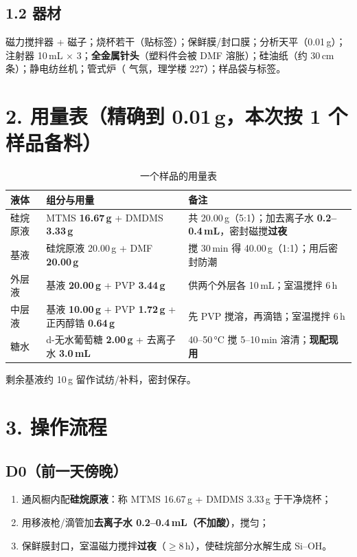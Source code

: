 \documentclass[a4paper, 11pt]{ctexart}
\begin{document}
\subsection*{1.2 器材}
磁力搅拌器 + 磁子；烧杯若干（贴标签）；保鲜膜/封口膜；分析天平（0.01\,g）；注射器 10\,mL $\times$ 3；\textbf{全金属针头}（塑料件会被 DMF 溶胀）；硅油纸（约 30\,cm 条）；静电纺丝机；管式炉（ 气氛，理学楼 227）；样品袋与标签。

\section*{2. 用量表（精确到 0.01\,g，本次按 1 个样品备料）}
\begin{table}[htbp]
\centering
\caption{一个样品的用量表}
\begin{tabularx}{\textwidth}{l l X}
\toprule
液体 & 组分与用量 & 备注 \\
\midrule
硅烷原液 & MTMS \textbf{16.67\,g} + DMDMS \textbf{3.33\,g} & 共 20.00\,g（5:1）；加去离子水 \textbf{0.2--0.4\,mL}，密封磁搅\textbf{过夜} \\
基液 & 硅烷原液 20.00\,g + DMF \textbf{20.00\,g} & 搅 30\,min 得 40.00\,g（1:1）；用后密封防潮 \\
外层液 & 基液 \textbf{20.00\,g} + PVP \textbf{3.44\,g} & 供两个外层各 10\,mL；室温搅拌 6\,h \\
中层液 & 基液 \textbf{10.00\,g} + PVP \textbf{1.72\,g} + 正丙醇锆 \textbf{0.64\,g} & 先 PVP 搅溶，再滴锆；室温搅拌 6\,h \\
糖水 & d-无水葡萄糖 \textbf{2.00\,g} + 去离子水 \textbf{3.0\,mL} & 40--50\,°C 搅 5--10\,min 溶清；\textbf{现配现用} \\
\bottomrule
\end{tabularx}
\end{table}

\noindent 剩余基液约 10\,g 留作试纺/补料，密封保存。

\section*{3. 操作流程}
\subsection*{D0（前一天傍晚）}
\begin{enumerate}
  \item 通风橱内配\textbf{硅烷原液}：称 MTMS 16.67\,g + DMDMS 3.33\,g 于干净烧杯；
  \item 用移液枪/滴管加\textbf{去离子水 0.2--0.4\,mL（不加酸）}，搅匀；
  \item 保鲜膜封口，室温磁力搅拌\textbf{过夜}（$\geq$8\,h），使硅烷部分水解生成 Si--OH。
\end{enumerate}
\end{document}
